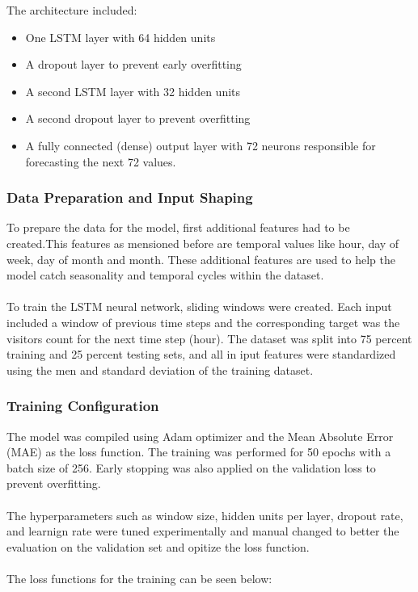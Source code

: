 \documentclass{article}
\begin{document}
The architecture included:

\begin{itemize}
    \item One LSTM layer with 64 hidden units
\end{itemize}

\begin{itemize}
    \item A dropout layer to prevent early overfitting
\end{itemize}

\begin{itemize}
    \item A second LSTM layer with 32 hidden units
\end{itemize}

\begin{itemize}
    \item A second dropout layer to prevent overfitting
\end{itemize}

\begin{itemize}
    \item A fully connected (dense) output layer with 72 neurons responsible for forecasting the next 72 values.
\end{itemize}


 \subsubsection{Data Preparation and Input Shaping}
To prepare the data for the model, first additional features had to be created.This features as mensioned before are temporal values like hour, day of week, day of month and month. These additional features are used to help the model catch seasonality and temporal cycles within the dataset.\\
\\
To train the LSTM neural network, sliding windows were created. Each input included a window of previous time steps and the corresponding target was the visitors count for the next time step (hour). The dataset was split into 75 percent training and 25 percent testing sets, and all in iput features were standardized using the men and standard deviation of the training dataset.

\subsubsection{Training Configuration}
The model was compiled using Adam optimizer and the Mean Absolute Error (MAE) as the loss function. The training was performed for 50 epochs with a batch size of 256. Early stopping was also applied on the validation loss to prevent overfitting.\\
\\
The hyperparameters such as window size, hidden units per layer, dropout rate, and learnign rate were tuned experimentally and manual changed to better the evaluation on the validation set and opitize the loss function.\\
\\
The loss functions for the training can be seen below:
\end{document}
